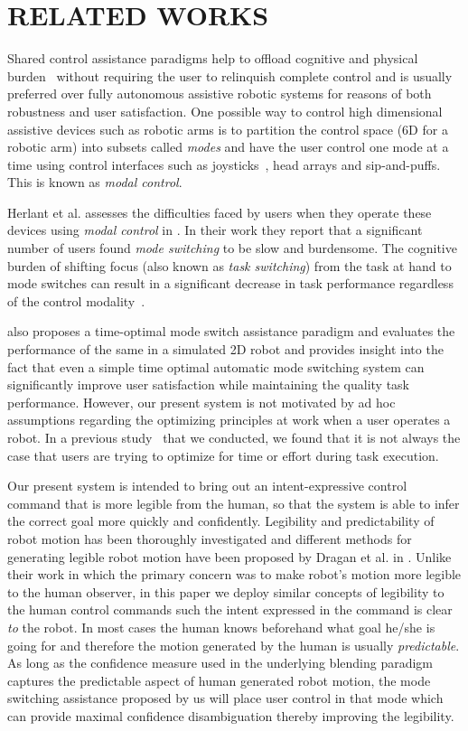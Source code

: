 \documentclass[conference]{IEEEtran}
\begin{document}
\section{RELATED WORKS}\label{RW} 

Shared control assistance paradigms help to offload cognitive and physical burden~\cite{volosyak2005rehabilitation} without requiring the user to relinquish complete control and is usually preferred over fully autonomous assistive robotic systems for reasons of both robustness and user satisfaction. One possible way to control high dimensional assistive devices such as robotic arms is to partition the control space (6D for a robotic arm) into subsets called \textit{modes} and have the user control one mode at a time using control interfaces such as joysticks~\cite{tsui2008development}, head arrays and sip-and-puffs. This is known as \textit{modal control}.

Herlant et al. assesses the difficulties faced by users when they operate these devices using \textit{modal control} in \cite{herlant2016assistive}. In their work they report that a significant number of users found \textit{mode switching} to be slow and burdensome. The cognitive burden of shifting focus (also known as \textit{task switching})  from the task at hand to mode switches can result in a significant decrease in task performance regardless of the control modality~\cite{monsell2003task}. 

\citet{herlant2016assistive} also proposes a time-optimal mode switch assistance paradigm and evaluates the performance of the same in a simulated 2D robot and provides insight into the fact that even a simple time optimal automatic mode switching system can significantly improve user satisfaction while maintaining the quality task performance. However, our present system is not motivated by ad hoc assumptions regarding the optimizing principles at work when a user operates a robot. In a previous study~\cite{gopinath2017human} that we conducted, we found that it is not always the case that users are trying to optimize for time or effort during task execution. 

Our present system is intended to bring out an intent-expressive control command that is more legible from the human, so that the system is able to infer the correct goal more quickly and confidently. Legibility and predictability of robot motion has been thoroughly investigated and different methods for generating legible robot motion have been proposed by Dragan et al. in \cite{dragan2013legibility,dragan2013generating}. Unlike their work in which the primary concern was to make robot's motion more legible to the human observer, in this paper we deploy similar concepts of legibility to the human control commands such the intent expressed in the command is clear \textit{to} the robot. In most cases the human knows beforehand what goal he/she is going for and therefore the motion generated by the human is usually \textit{predictable}. As long as the confidence measure used in the underlying blending paradigm captures the predictable aspect of human generated robot motion, the mode switching assistance proposed by us will place user control in that mode which can provide maximal confidence disambiguation thereby improving the legibility.
\end{document}
